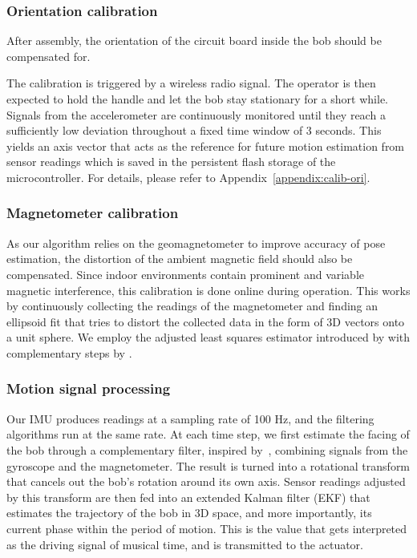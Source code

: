 \documentclass{nime-alternate} %
\begin{document}
\subsubsection{Orientation calibration}
After assembly, the orientation of the circuit board inside the bob should be compensated for.

The calibration is triggered by a wireless radio signal. The operator is then expected to hold the handle and let the bob stay stationary for a short while. Signals from the accelerometer are continuously monitored until they reach a sufficiently low deviation throughout a fixed time window of 3 seconds. This yields an axis vector that acts as the reference for future motion estimation from sensor readings which is saved in the persistent flash storage of the microcontroller. For details, please refer to Appendix~\ref{appendix:calib-ori}.

\subsubsection{Magnetometer calibration}
As our algorithm relies on the geomagnetometer to improve accuracy of pose estimation, the distortion of the ambient magnetic field should also be compensated. Since indoor environments contain prominent and variable magnetic interference, this calibration is done online during operation. This works by continuously collecting the readings of the magnetometer and finding an ellipsoid fit that tries to distort the collected data in the form of 3D vectors onto a unit sphere. We employ the adjusted least squares estimator introduced by \cite{Markovsky_2004_ALS} with complementary steps by \cite{Renaudin2010}.

\subsubsection{Motion signal processing}
Our IMU produces readings at a sampling rate of 100 Hz, and the filtering algorithms run at the same rate. At each time step, we first estimate the facing of the bob through a complementary filter, inspired by~\cite{Min_Complementary}, combining signals from the gyroscope and the magnetometer. The result is turned into a rotational transform that cancels out the bob's rotation around its own axis. Sensor readings adjusted by this transform are then fed into an extended Kalman filter (EKF) that estimates the trajectory of the bob in 3D space, and more importantly, its current phase within the period of motion. This is the value that gets interpreted as the driving signal of musical time, and is transmitted to the actuator.
\end{document}
